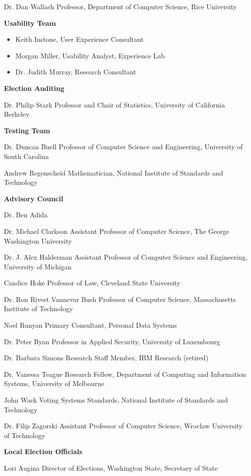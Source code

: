 Dr. Dan Wallach
Professor, Department of Computer Science, Rice University
 
\textbf{Usability Team}

\begin{itemize}
\item Keith Instone, User Experience Consultant
\item Morgan Miller, Usability Analyst, Experience Lab
\item Dr. Judith Murray, Research Consultant
\end{itemize}

\textbf{Election Auditing}

Dr. Philip Stark
Professor and Chair of Statistics, University of California Berkeley
 
\textbf{Testing Team}

Dr. Duncan Buell
Professor of Computer Science and Engineering, University of South Carolina
 
Andrew Regenscheid
Mathematician, National Institute of Standards and Technology
 
\textbf{Advisory Council}

Dr. Ben Adida
 
Dr. Michael Clarkson
Assistant Professor of Computer Science, The George Washington University
 
Dr. J. Alex Halderman
Assistant Professor of Computer Science and Engineering, University of Michigan
 
Candice Hoke
Professor of Law, Cleveland State University
 
Dr. Ron Rivest
Vannevar Bush Professor of Computer Science, Massachusetts Institute of Technology
 
Noel Runyan
Primary Consultant, Personal Data Systems
 
Dr. Peter Ryan
Professor in Applied Security, University of Luxembourg
 
Dr. Barbara Simons
Research Staff Member, IBM Research (retired)
 
Dr. Vanessa Teague
Research Fellow, Department of Computing and Information Systems, University of Melbourne
 
John Wack
Voting Systems Standards, National Institute of Standards and Technology
 
Dr. Filip Zagorski
Assistant Professor of Computer Science, Wroclaw University of Technology
 
\textbf{Local Election Officials}

Lori Augina
Director of Elections, Washington State, Secretary of State

